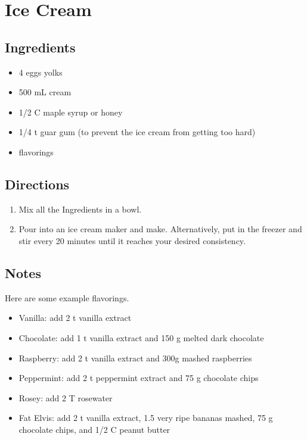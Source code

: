 \documentclass[letterpaper,10pt,english]{sphinxmanual}
\begin{document}
\chapter{Ice Cream}
\label{ice_cream:ice-cream}\label{ice_cream::doc}

\section{Ingredients}
\label{ice_cream:ingredients}\begin{itemize}
\item {} 
4         eggs yolks

\item {} 
500   mL  cream

\item {} 
1/2   C   maple syrup or honey

\item {} 
1/4   t   guar gum (to prevent the ice cream from getting too hard)

\item {} 
flavorings

\end{itemize}


\section{Directions}
\label{ice_cream:directions}\begin{enumerate}
\item {} 
Mix all the Ingredients in a bowl.

\item {} 
Pour into an ice cream maker and make. Alternatively, put in the freezer and stir every 20 minutes until it reaches your desired consistency.

\end{enumerate}


\section{Notes}
\label{ice_cream:notes}
Here are some example flavorings.
\begin{itemize}
\item {} 
Vanilla: add 2 t vanilla extract

\item {} 
Chocolate: add 1 t vanilla extract and 150 g melted dark chocolate

\item {} 
Raspberry: add 2 t vanilla extract and 300g mashed raspberries

\item {} 
Peppermint: add 2 t peppermint extract and 75 g chocolate chips

\item {} 
Rosey: add 2 T rosewater

\item {} 
Fat Elvis: add 2 t vanilla extract, 1.5 very ripe bananas mashed, 75 g chocolate chips, and 1/2 C peanut butter

\end{itemize}
\end{document}
